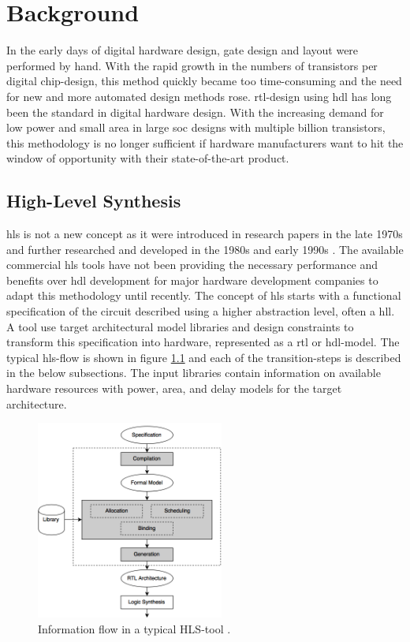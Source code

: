 \chapter{\label{chp:background}Background}
In the early days of digital hardware design, gate design and layout were performed by hand. With the rapid growth in the numbers of transistors per digital chip-design, this method quickly became too time-consuming and the need for new and more automated design methods rose. \gls{rtl}-design using \gls{hdl} has long been the standard in digital hardware design. With the increasing demand for low power and small area in large \gls{soc} designs with multiple billion transistors, this methodology is no longer sufficient if hardware manufacturers want to hit the window of opportunity with their state-of-the-art product.

\section{\label{sec:hls}High-Level Synthesis}

\gls{hls} is not a new concept as it were introduced in research papers in the late 1970s and further researched and developed in the 1980s and early 1990s \cite{martin2009high}. The available commercial \gls{hls} tools have not been providing the necessary performance and benefits over \gls{hdl} development for major hardware development companies to adapt this methodology until recently.
The concept of \gls{hls} starts with a functional specification of the circuit described using a higher abstraction level, often a \gls{hll}. A tool use target architectural model libraries and design constraints to transform this specification into hardware, represented as a \gls{rtl} or \gls{hdl}-model. The typical \gls{hls}-flow is shown in figure \ref{fig:hlsflow} and each of the transition-steps is described in the below subsections. The input libraries contain information on available hardware resources with power, area, and delay models for the target architecture.

\begin{figure}[hbpt]
\centering
\includegraphics[width=0.55\textwidth]{../figs/HLSFlow.png}
\caption{\label{fig:hlsflow}Information flow in a typical HLS-tool \cite{coussy2009introduction}.}
\end{figure}

